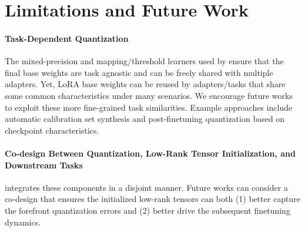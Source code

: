 \section{Limitations and Future Work}

\paragraph{Task-Dependent Quantization} The mixed-precision and mapping/threshold learners used by \FWName{} ensure that the final base weights are task agnostic and can be freely shared with multiple adapters. Yet, LoRA base weights can be reused by adapters/tasks that share some common characteristics under many scenarios. We encourage future works to exploit these more fine-grained task similarities. Example approaches include automatic calibration set synthesis and post-finetuning quantization based on checkpoint characteristics.

\paragraph{Co-design Between Quantization, Low-Rank Tensor Initialization, and Downstream Tasks} \FWName{} integrates these components in a disjoint manner. Future works can consider a co-design that ensures the initialized low-rank tensors can both (1) better capture the forefront quantization errors and (2) better drive the subsequent finetuning dynamics.